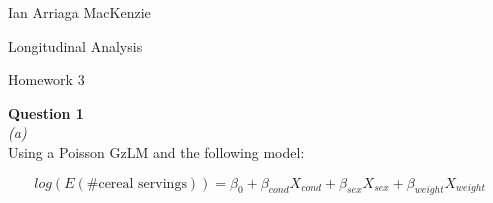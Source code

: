 \documentclass[11pt,a4paper]{article}
\begin{document}
\begin{flushright}
Ian Arriaga MacKenzie

Longitudinal Analysis

Homework 3\\
\end{flushright}

\textbf{Question 1}\\

\textit{(a)}\\

Using a Poisson GzLM and the following model:

$$ log ( E ( \mbox{\# cereal servings} ) ) = \beta_0 + \beta_{cond} X_{cond} + \beta_{sex} X_{sex} + \beta_{weight} X_{weight} $$
\end{document}
